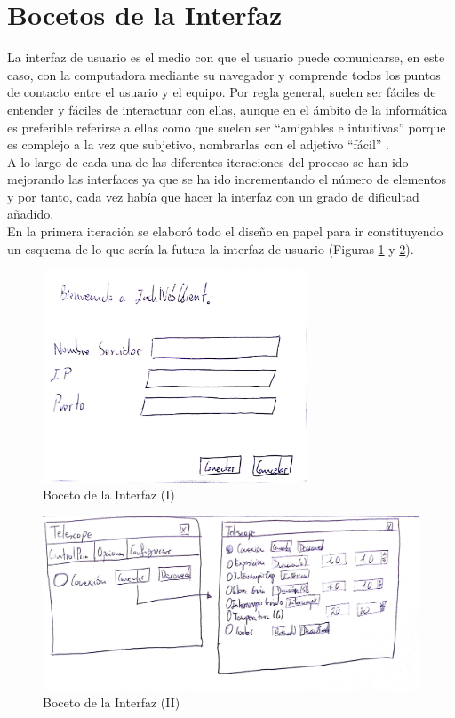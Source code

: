 \section{Bocetos de la Interfaz}
La interfaz de usuario es el medio con que el usuario puede comunicarse, en este caso, con la computadora mediante su navegador y comprende todos los puntos de contacto entre el usuario y el equipo. Por regla general, suelen ser fáciles de entender y fáciles de interactuar con ellas, aunque en el ámbito de la informática es preferible referirse a ellas como que suelen ser “amigables e intuitivas” porque es complejo a la vez que  subjetivo, nombrarlas con el adjetivo “fácil” \cite{IU}.\\

A lo largo de cada una de las diferentes iteraciones del proceso se han ido mejorando las interfaces ya que se ha ido incrementando el número de elementos y por tanto, cada vez había que hacer la interfaz con un grado de dificultad añadido.\\

En la primera iteración se elaboró todo el diseño en papel para ir constituyendo un esquema de lo que sería la futura la interfaz de usuario (Figuras \ref{fig:boceto1} y \ref{fig:boceto2}).\\
\begin{figure}[htb]
\centering
\includegraphics[width=0.7\textwidth]{./imagenes/boceto1}
\caption{Boceto de la Interfaz (I)} \label{fig:boceto1}
\end{figure}

\begin{figure}[htb]
\centering
\includegraphics[width=1\textwidth]{./imagenes/boceto2}
\caption{Boceto de la Interfaz (II)} \label{fig:boceto2}
\end{figure}


